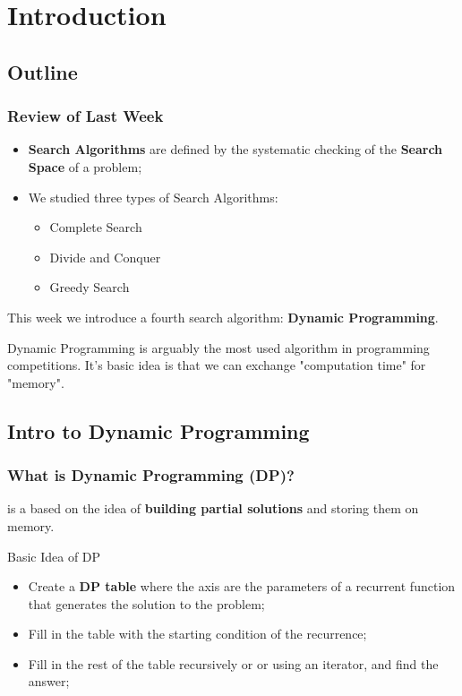 
\section{Introduction}
\subsection{Outline}

\begin{frame}
  \frametitle{Review of Last Week}
  \begin{itemize}
  \item {\bf Search Algorithms} are defined by the systematic checking of the {\bf Search Space} of a problem;\bigskip

  \item We studied three types of Search Algorithms:
    \begin{itemize}
    \item Complete Search
    \item Divide and Conquer
    \item Greedy Search
    \end{itemize}
  \end{itemize}
  \bigskip

  \begin{block}{}
    This week we introduce a fourth search algorithm: {\bf Dynamic Programming}.
    \medskip

    Dynamic Programming is arguably the most used algorithm in programming competitions. It's basic idea is that we can exchange "computation time" for "memory".
  \end{block}
\end{frame}

\subsection{Intro to Dynamic Programming}
\begin{frame}
  \frametitle{What is Dynamic Programming (DP)?}

   is a  based on the idea of {\bf building partial solutions} and storing them on memory.

  \bigskip

  \begin{block}{Basic Idea of DP}
    \begin{itemize}
      \item Create a {\bf DP table} where the axis are the parameters of a recurrent function that generates the solution to the problem; \bigskip

      \item Fill in the table with the starting condition of the recurrence;\bigskip

      \item Fill in the rest of the table recursively or or using an iterator, and find the answer;
    \end{itemize}
  \end{block}
\end{frame}

